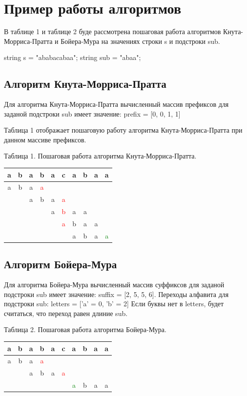 \documentclass[12pt]{report}
\begin{document}
\section{Пример работы алгоритмов}
В таблице 1 и таблице 2 буде рассмотрена пошаговая работа алгоритмов Кнута-Морриса-Пратта и Бойера-Мура на значениях строки s и подстроки sub.  

string s = "ababacabaa";  
string sub = "abaa";   

\subsection{Алгоритм Кнута-Морриса-Пратта}
Для алгоритма Кнута-Морриса-Пратта вычисленный массив префиксов для заданой  подстроки sub имеет значение:
prefix = [0, 0, 1, 1]

Таблица 1 отображает пошаговую работу алгоритма Кнута-Морриса-Пратта при данном массиве префиксов.
 
\begin{center}
Таблица 1. Пошаговая работа алгоритма Кнута-Морриса-Пратта.\\

\begin{tabular}{| c | c | c | c | c | c | c | c | c | c | }
	\hline
	a&b&a&b&a&c&a&b&a&a \\
	\hline
	\hline
	a&b&a&\textcolor{red}{a}&&&&&&\\
	\hline
	&&a&b&a&\textcolor{red}{a}&&&&\\
	\hline
	&&&&a&\textcolor{red}{b}&a&a&&\\
	\hline
	&&&&&\textcolor{red}{a}&b&a&a&\\
	\hline
	&&&&&&a&b&a&\textcolor{green}{a}\\
	\hline

	
\end{tabular}
\end{center}

\subsection{Алгоритм Бойера-Мура}
Для алгоритма Бойера-Мура вычисленный массив суффиксов для заданой  подстроки sub имеет значение:
suffix = [2, 5, 5, 6].
Переходы алфавита для подстроки sub:
letters = ['a' = 0, 'b' = 2]   
Если буквы нет в letters, будет считаться, что переход равен длиние sub.

\begin{center}
Таблица 2. Пошаговая работа алгоритма Бойера-Мура.\\

\begin{tabular}{| c | c | c | c | c | c | c | c | c | c | }
	\hline
	a&b&a&b&a&c&a&b&a&a \\
	\hline
	\hline
	a&b&a&\textcolor{red}{a}&&&&&&\\
	\hline
	&&a&b&a&\textcolor{red}{a}&&&&\\
	\hline
	&&&&&&\textcolor{green}{a}&b&a&a\\
	\hline

	
\end{tabular}
\end{center}
\end{document}
